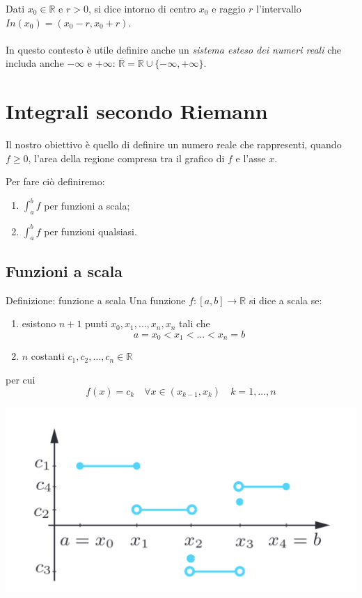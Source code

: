 \documentclass[x11names]{article}
\begin{document}
	\noindent
	Dati $x_0\in \mathbb{R} $ e $ r>0$, si dice intorno di centro $x_0$ e raggio $r$ l'intervallo $In(x_0) = (x_0 -r, x_0 +r)$.
	\\\\
	\noindent
	In questo contesto è utile definire anche un \textit{sistema esteso dei numeri reali} che includa anche $-\infty $ e $ +\infty$: $\overline{\mathbb{R}} = \mathbb{R} \cup \{ -\infty,+\infty \}$. 
	
	\newpage
	\section{Integrali secondo Riemann}
	Il nostro obiettivo è quello di definire un numero reale che rappresenti, quando $f \geq 0$, l'area della regione compresa tra il grafico di $f$ e l'asse $x$.
	
	
	\noindent
	Per fare ciò definiremo:
	\begin{enumerate}
		\item $\int_{a}^{b}f$ per funzioni a scala;
		\item $\int_{a}^{b}f$ per funzioni qualsiasi.
	\end{enumerate}
	
	\subsection{Funzioni a scala}
		\begin{center}
		\colorbox{myblue}{\begin{minipage}{5.75in}
				\begin{blues}{Definizione: funzione a scala}
					Una funzione $f: [a,b] \to \mathbb{R}$ si dice a scala se:
					\begin{enumerate}
						\item esistono $n+1$ punti $x_0,x_1, \dots, x_n, x_n$ tali che
						\[
						a = x_0 < x_1 < \dots < x_n =b
						\]
						\item $n$ costanti $c_1, c_2 , \dots , c_n \in \mathbb{R}$
					\end{enumerate}
					 per cui
					 \[
					 f(x) = c_k \quad \forall x \in (x_{k-1}, x_k) \quad k=1,\dots,n
					 \]
				\end{blues}
		\end{minipage}}       
	\end{center}

	
	\begin{center}
		\includegraphics[scale=0.2]{figures/scala}
	\end{center}
	
\end{document}
